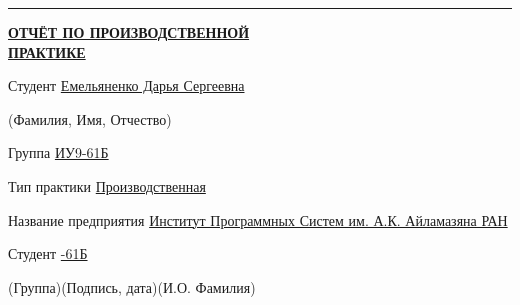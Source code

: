 \documentclass[14pt, russian]{scrartcl}
\begin{document}
\begin{titlepage}
\vspace*{-16pt}
\hspace{25pt}\rule{0.875\textwidth}{0.4pt}
 
 
\vspace{3em}
 
\begin{center}
\Large {\textbf{\uline{ОТЧЁТ ПО ПРОИЗВОДСТВЕННОЙ}}} \\ {\textbf{\uline{ПРАКТИКЕ}}}
\end{center}\normalsize

\vspace{2ex}
\noindent Студент \underline{\hspace{16pt}\footnotesize Емельяненко Дарья Сергеевна\hspace{228pt}}\normalsize

\vspace{-1.8ex}
\noindent\hspace{31ex} \scriptsize{(Фамилия, Имя, Отчество)}\normalsize

\vspace{0.7ex}
\noindent Группа \underline{\hspace{16pt}\footnotesize ИУ9-61Б\hspace{50pt}}\normalsize

\vspace{2ex}
\noindent Тип практики \underline{\hspace{16pt}\footnotesize Производственная\hspace{265pt}}\normalsize

\vspace{2.5ex}
\noindent Название предприятия \underline{\hspace{16pt}\footnotesize Институт Программных Систем им. А.К. Айламазяна РАН\hspace{12pt}}\normalsize

\vspace{\fill}
 

\noindent Студент \underline{-61Б\hspace{1.5cm}} \hfill \underline{\hspace{4cm}}\quad
\underline{\hspace{4cm}}

\vspace{-2.1ex}
\noindent\hspace{9ex}\scriptsize{(Группа)}\normalsize\hspace{170pt}\hspace{2ex}\scriptsize{(Подпись, дата)}\normalsize\hspace{30pt}\hspace{6ex}\scriptsize{(И.О. Фамилия)}\normalsize


\end{titlepage}
\end{document}
